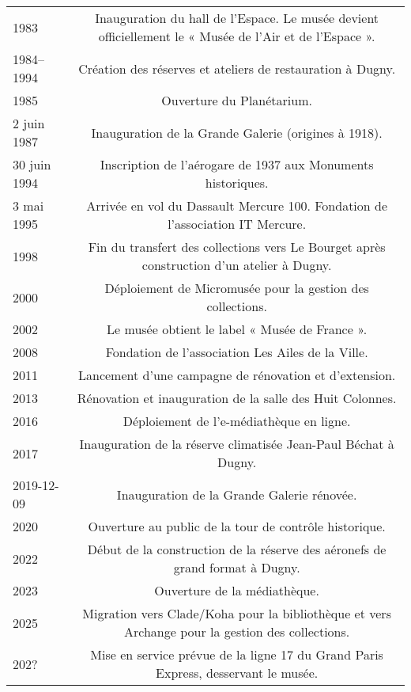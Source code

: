 \begin{longtable}{B C}
	1983 & Inauguration du hall de l'Espace. Le musée devient officiellement le « Musée de l'Air et de l'Espace ». \\
	 1984--1994 & Création des réserves et ateliers de restauration à Dugny. \\
	 1985 & Ouverture du Planétarium. \\
	 2 juin 1987 & Inauguration de la Grande Galerie (origines à 1918). \\
	 30 juin 1994 & Inscription de l'aérogare de 1937 aux Monuments historiques. \\
	 3 mai 1995 & Arrivée en vol du Dassault Mercure 100. Fondation de l'association IT Mercure. \\
	 1998 & Fin du transfert des collections vers Le Bourget après construction d'un atelier à Dugny. \\
	 2000 & Déploiement de Micromusée pour la gestion des collections. \\
	 2002 & Le musée obtient le label « Musée de France ». \\
	 2008 & Fondation de l'association Les Ailes de la Ville. \\
	
	
	2011 & Lancement d'une campagne de rénovation et d'extension. \\
	2013 & Rénovation et inauguration de la salle des Huit Colonnes. \\
	2016 & Déploiement de l'e-médiathèque en ligne. \\
	2017 & Inauguration de la réserve climatisée Jean-Paul Béchat à Dugny. \\
	2019-12-09 & Inauguration de la Grande Galerie rénovée. \\
	2020 & Ouverture au public de la tour de contrôle historique. \\
	2022 & Début de la construction de la réserve des aéronefs de grand format à Dugny. \\
	2023 & Ouverture de la médiathèque. \\
	2025 & Migration vers Clade/Koha pour la bibliothèque et vers Archange pour la gestion des collections. \\
	202? & Mise en service prévue de la ligne 17 du Grand Paris Express, desservant le musée. \\
	
\end{longtable}